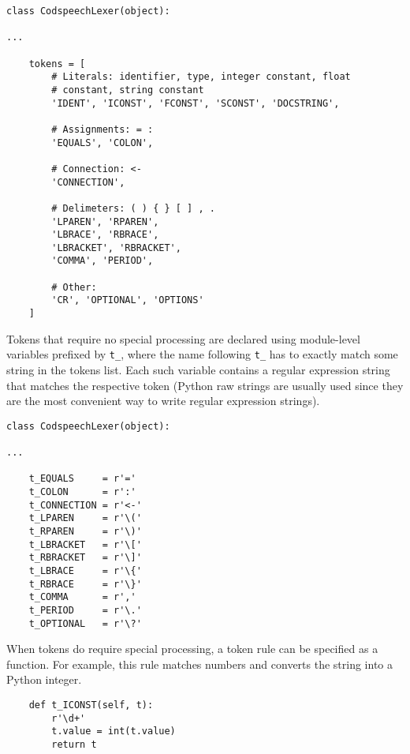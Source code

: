 \begin{lstlisting}
class CodspeechLexer(object):

...

    tokens = [
        # Literals: identifier, type, integer constant, float
        # constant, string constant
        'IDENT', 'ICONST', 'FCONST', 'SCONST', 'DOCSTRING',

        # Assignments: = :
        'EQUALS', 'COLON',

        # Connection: <-
        'CONNECTION',

        # Delimeters: ( ) { } [ ] , .
        'LPAREN', 'RPAREN',
        'LBRACE', 'RBRACE',
        'LBRACKET', 'RBRACKET',
        'COMMA', 'PERIOD',

        # Other:
        'CR', 'OPTIONAL', 'OPTIONS'
    ]
\end{lstlisting}

Tokens that require no special processing are declared using
module-level variables prefixed by \texttt{t_}, where the name
following \texttt{t_} has to exactly match some string in the tokens
list. Each such variable contains a regular expression string that
matches the respective token (Python raw strings are usually used
since they are the most convenient way to write regular expression
strings).

\begin{lstlisting}
class CodspeechLexer(object):

...

    t_EQUALS     = r'='
    t_COLON      = r':'
    t_CONNECTION = r'<-'
    t_LPAREN     = r'\('
    t_RPAREN     = r'\)'
    t_LBRACKET   = r'\['
    t_RBRACKET   = r'\]'
    t_LBRACE     = r'\{'
    t_RBRACE     = r'\}'
    t_COMMA      = r','
    t_PERIOD     = r'\.'
    t_OPTIONAL   = r'\?'
\end{lstlisting}

When tokens do require special processing, a token rule can be
specified as a function. For example, this rule matches numbers and
converts the string into a Python integer.

\begin{lstlisting}
    def t_ICONST(self, t):
        r'\d+'
        t.value = int(t.value)
        return t
\end{lstlisting}

